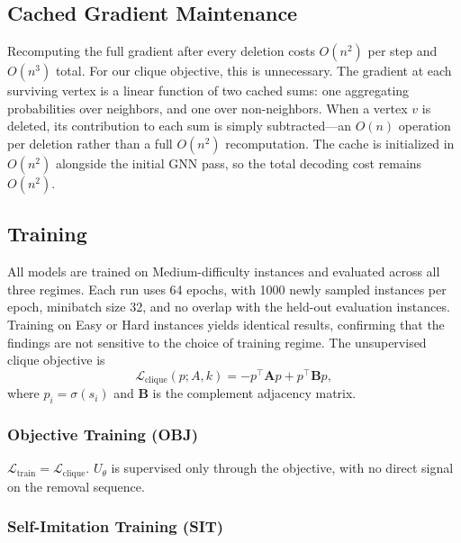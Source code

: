 \documentclass[journal,article,submit,pdftex,moreauthors]{Definitions/mdpi}
\begin{document}
\subsection{Cached Gradient Maintenance}
\label{sec:cached_maintenance}

Recomputing the full gradient after every deletion costs $O(n^2)$ per step and
$O(n^3)$ total. For our clique objective, this is unnecessary. The gradient at
each surviving vertex is a linear function of two cached sums: one aggregating
probabilities over neighbors, and one over non-neighbors. When a vertex $v$ is
deleted, its contribution to each sum is simply subtracted---an $O(n)$ operation
per deletion rather than a full $O(n^2)$ recomputation. The cache is initialized
in $O(n^2)$ alongside the initial GNN pass, so the total decoding cost remains
$O(n^2)$.

\subsection{Training}
\label{sec:training}

All models are trained on Medium-difficulty instances and evaluated across all three
regimes. Each run uses 64 epochs, with 1000 newly sampled instances per epoch,
minibatch size 32, and no overlap with the held-out evaluation instances. Training
on Easy or Hard instances yields identical results, confirming that the findings are
not sensitive to the choice of training regime. The unsupervised clique objective is
\begin{equation}
  \mathcal{L}_{\mathrm{clique}}(p; A, k)
  =
  -p^\top \mathbf{A} p
  +
  p^\top \mathbf{B} p,
  \label{eq:clique_loss}
\end{equation}
where $p_i = \sigma(s_i)$ and $\mathbf{B}$ is the complement adjacency matrix.

\subsubsection{Objective Training (OBJ)}

$\mathcal{L}_{\mathrm{train}} = \mathcal{L}_{\mathrm{clique}}$. $U_\theta$ is
supervised only through the objective, with no direct signal on the removal
sequence.

\subsubsection{Self-Imitation Training (SIT)}
\end{document}
